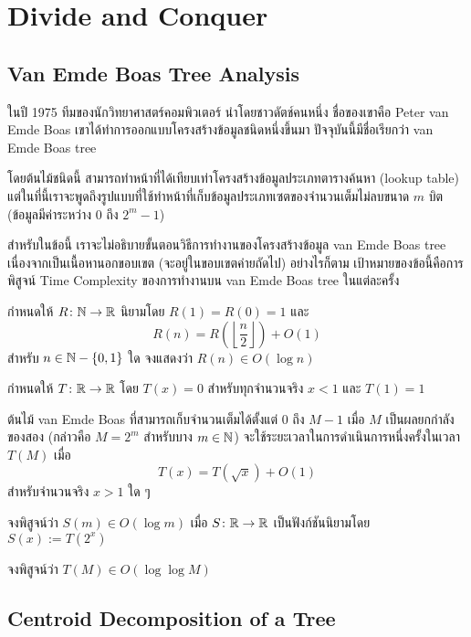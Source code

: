 \chapter{Divide and Conquer}

\section{Van Emde Boas Tree Analysis}

ในปี 1975 ทีมของนักวิทยาศาสตร์คอมพิวเตอร์ นำโดยชาวดัตช์คนหนึ่ง ชื่อของเขาคือ Peter van Emde Boas เขาได้ทำการออกแบบโครงสร้างข้อมูลชนิดหนึ่งขึ้นมา ปัจจุบันนี้มีชื่อเรียกว่า van Emde Boas tree

โดยต้นไม้ชนิดนี้ สามารถทำหน้าที่ได้เทียบเท่าโครงสร้างข้อมูลประเภทตารางค้นหา (lookup table) แต่ในที่นี้เราจะพูดถึงรูปแบบที่ใช้ทำหน้าที่เก็บข้อมูลประเภทเซตของจำนวนเต็มไม่ลบขนาด $m$ บิต (ข้อมูลมีค่าระหว่าง $0$ ถึง $2^m-1$)

สำหรับในข้อนี้ เราจะไม่อธิบายขั้นตอนวิธีการทำงานของโครงสร้างข้อมูล van Emde Boas tree เนื่องจากเป็นเนื้อหานอกขอบเขต (จะอยู่ในขอบเขตค่ายถัดไป) อย่างไรก็ตาม เป้าหมายของข้อนี้คือการพิสูจน์ Time Complexity ของการทำงานบน van Emde Boas tree ในแต่ละครั้ง

\begin{exercise}
กำหนดให้ $R \colon \mathbb{N} \to \mathbb{R}$ นิยามโดย $R(1) = R(0) = 1$ และ 
\[
R(n) = R\left(\left\lfloor\frac{n}{2}\right\rfloor\right) + O(1)
\]
สำหรับ $n \in \mathbb{N} - \{0, 1\}$ ใด จงแสดงว่า $R(n) \in O(\log n)$
\end{exercise}

กำหนดให้ $T \colon \mathbb{R} \to \mathbb{R}$ โดย $T(x) = 0$ สำหรับทุกจำนวนจริง $x < 1$ และ $T(1) = 1$

ต้นไม้ van Emde Boas ที่สามารถเก็บจำนวนเต็มได้ตั้งแต่ $0$ ถึง $M-1$ เมื่อ $M$ เป็นผลยกกำลังของสอง (กล่าวคือ $M = 2^m$ สำหรับบาง $m \in \mathbb{N}$) จะใช้ระยะเวลาในการดำเนินการหนึ่งครั้งในเวลา $T(M)$ เมื่อ
\[
T(x) = T(\sqrt{x}) + O(1)
\]
สำหรับจำนวนจริง $x > 1$ ใด ๆ

\begin{exercise}
จงพิสูจน์ว่า $S(m) \in O(\log m)$ เมื่อ $S \colon \mathbb{R} \to \mathbb{R}$ เป็นฟังก์ชันนิยามโดย $S(x) := T(2^x)$
\end{exercise}

\begin{exercise}
จงพิสูจน์ว่า $T(M) \in O(\log \log M)$
\end{exercise}

\section{Centroid Decomposition of a Tree}

